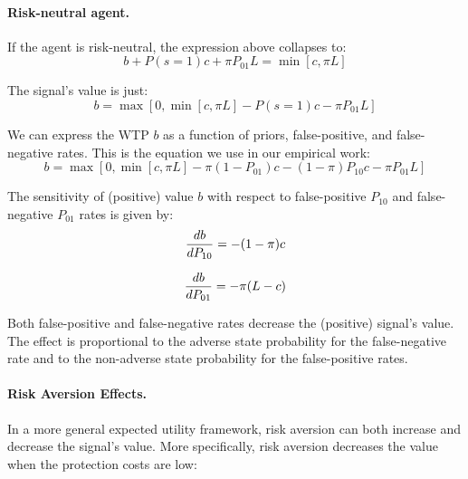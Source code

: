\documentclass[12pt,a4paper]{article}
\begin{document}
\paragraph{Risk-neutral agent.} If the agent is risk-neutral, the expression above collapses to:
$$b+P(s=1)c+\pi P_{01}L=\min[c,\pi L]$$

The signal's value is just:
\begin{equation}
b=\max[0,\min[c,\pi L]-P(s=1)c-\pi P_{01}L]
\end{equation}

We can express the WTP $b$ as a function of priors, false-positive, and false-negative rates. This is the equation we use in our empirical work:
\begin{equation}
b=\max[0,\min[c,\pi L]-\pi (1-P_{01})c-(1-\pi)P_{10}c-\pi P_{01}L]
\end{equation}\label{eq:rnWTP}

The sensitivity of (positive) value $b$ with respect to false-positive $P_{10}$ and false-negative $P_{01}$ rates is given by:
\begin{equation}
{db\over dP_{10}}=-(1-\pi)c
\end{equation}

\begin{equation}
{db\over dP_{01}}=-\pi(L-c)
\end{equation}
\vspace{10pt}

Both false-positive and false-negative rates decrease the (positive) signal's value. The effect is proportional to the adverse state probability for the false-negative rate and to the non-adverse state probability for the false-positive rates.

\paragraph{Risk Aversion Effects.} In a more general expected utility framework, risk aversion can both increase and decrease the signal's value. More specifically, risk aversion decreases the value when the protection costs are low: 
\end{document}
